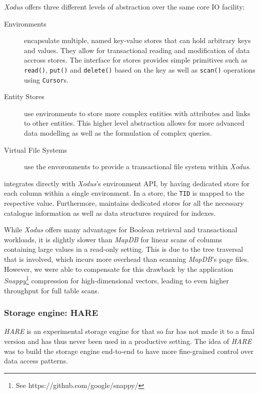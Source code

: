 \emph{Xodus} offers three different levels of abstraction over the same core IO facility:

\begin{description}
    \item [Environments] encapsulate multiple, named key-value stores that can hold arbitrary keys and values. They allow for transactional reading and modification of data accross stores. The interface for stores provides simple primitives such as \texttt{read()}, \texttt{put()} and \texttt{delete()} based on the key as well as \texttt{scan()} operations using \texttt{Cursor}s.
    \item [Entity Stores] use environments to store more complex entities with attributes and links to other entities. This higher level abstraction allows for more advanced data modelling as well as the formulation of complex queries.
    \item [Virtual File Systems] use the envoronments to provide a transactional file system within \emph{Xodus}.
\end{description}

\cottontail{} integrates directly with \emph{Xodus}'s environment API, by having dedicated store for each column within a single environment. In a store, the \texttt{TID} is mapped to the respective value. Furthermore, \cottontail{} maintains dedicated stores for all the necessary catalogue information as well as data structures required for indexes.

While \emph{Xodus} offers many advantages for Boolean retrieval and transactional workloads, it is slightly slower than \emph{MapDB} for linear scans of columns containing large values in a read-only setting. This is due to the tree traversal that is involved, which incurs more overhead than scanning \emph{MapDB}'s page files. However, we were able to compensate for this drawback by the application \emph{Snappy}\footnote{See https://github.com/google/snappy/} compression for high-dimensional vectors, leading to even higher throughput for full table scans.

\subsubsection{Storage engine: HARE}

\emph{HARE} is an experimental storage engine for \cottontail{} that so far has not made it to a final version and has thus never been used in a productive setting. The idea of \emph{HARE} was to build the storage engine end-to-end to have more fine-grained control over data access patterns.

